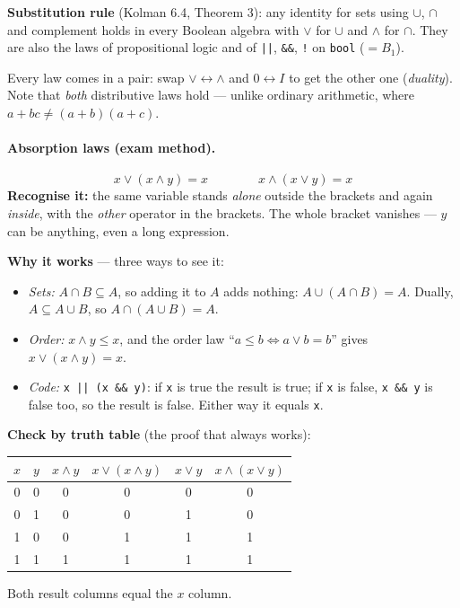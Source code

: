 \documentclass{fkt-notes}
\theoremstyle{definition}
\begin{document}
%
\begin{rulepar}
  \textbf{Substitution rule} (Kolman 6.4, Theorem 3): any identity for sets using $\cup$, $\cap$ and complement holds in every Boolean algebra with $\vee$ for $\cup$ and $\wedge$ for $\cap$. They are also the laws of propositional logic and of \texttt{||}, \texttt{\&\&}, \texttt{!} on \texttt{bool} ($=B_1$).

  Every law comes in a pair: swap $\vee \leftrightarrow \wedge$ and
  $0 \leftrightarrow I$ to get the other one (\emph{duality}).
  Note that \emph{both} distributive laws hold --- unlike ordinary
  arithmetic, where $a + bc \ne (a+b)(a+c)$.
\end{rulepar}

\begin{rulepar}
  \paragraph{Absorption laws (exam method).}
  \[
    x \vee (x \wedge y) = x \qquad\qquad x \wedge (x \vee y) = x
  \]
  \textbf{Recognise it:} the same variable stands \emph{alone} outside the
  brackets and again \emph{inside}, with the \emph{other} operator in the
  brackets. The whole bracket vanishes --- $y$ can be anything, even a
  long expression.
\end{rulepar}

\textbf{Why it works} --- three ways to see it:
\begin{itemize}[nosep]
  \item \emph{Sets:} $A \cap B \subseteq A$, so adding it to $A$ adds
        nothing: $A \cup (A \cap B) = A$. Dually, $A \subseteq A \cup B$,
        so $A \cap (A \cup B) = A$.
  \item \emph{Order:} $x \wedge y \le x$, and the order law
        ``$a \le b \iff a \vee b = b$'' gives $x \vee (x \wedge y) = x$.
  \item \emph{Code:} \texttt{x || (x \&\& y)}: if \texttt{x} is true the
        result is true; if \texttt{x} is false, \texttt{x \&\& y} is false
        too, so the result is false. Either way it equals \texttt{x}.
\end{itemize}

\textbf{Check by truth table} (the proof that always works):
\begin{center}
  \begin{tabular}{cc|c|c|c|c}
    $x$ & $y$ & $x \wedge y$ & $x \vee (x \wedge y)$ & $x \vee y$ & $x \wedge (x \vee y)$ \\ \hline
    0   & 0   & 0            & 0                     & 0          & 0                     \\
    0   & 1   & 0            & 0                     & 1          & 0                     \\
    1   & 0   & 0            & 1                     & 1          & 1                     \\
    1   & 1   & 1            & 1                     & 1          & 1
  \end{tabular}
\end{center}
Both result columns equal the $x$ column.
\end{document}
